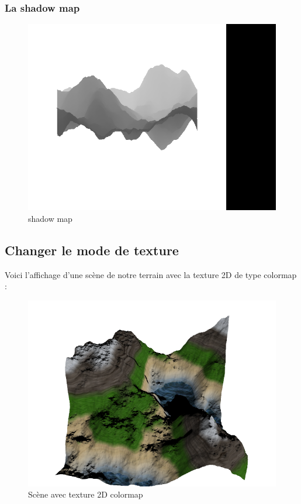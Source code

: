 \documentclass{article}
\begin{document}
\subsubsection{La shadow map}

\begin{figure}[h]
	\center
	\includegraphics[scale=0.30]{screen6.png}
	\caption{shadow map}
\end{figure}
\newpage
\subsection{Changer le mode de texture}

Voici l'affichage d'une scène de notre terrain avec la texture 2D de type colormap :

\begin{figure}[h]
	\center
	\includegraphics[scale=0.30]{screen9.png}
	\caption{Scène avec texture 2D colormap}
\end{figure}
\end{document}
